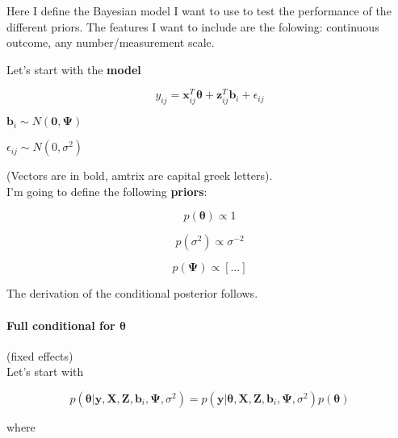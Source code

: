 \documentclass[a4paper]{article}
\begin{document}
Here I define the Bayesian model I want to use to test the performance of the different priors. The features I want to include are the folowing: continuous outcome, any number/measurement scale.

Let's start with the \textbf{model}

\begin{equation}
	y_{ij} = \bm{x}^{T}_{ij} \bm{\theta} + \bm{z}^{T}_{ij}\bm{b}_i + \epsilon_{ij}
\end{equation}

$ \bm{b}_i \sim N(\bm{0}, \bm{\Psi}) $

$ \epsilon_{ij} \sim N(0, \sigma^2) $

\vspace{5mm}

(Vectors are in bold, amtrix are capital greek letters).\\
I'm going to define the following \textbf{priors}:

\vspace{5mm}



\begin{equation}
p(\bm{\theta}) \propto 1
\end{equation}

\begin{equation}
p(\sigma^2) \propto \sigma^{-2}
\end{equation}

\begin{equation}
p(\bm{\Psi}) \propto [...]
\end{equation}

\vspace{5mm}

The derivation of the conditional posterior follows.

\paragraph{Full conditional for $\bm{\theta}$}(fixed effects) \\

Let's start with

\begin{equation}
	p(\bm{\theta}|\bm{y}, \bm{X}, \bm{Z}, \bm{b}_{i}, \bm{\Psi}, \sigma^2) = 	p(\bm{y}|\bm{\theta}, \bm{X}, \bm{Z}, \bm{b}_{i}, \bm{\Psi}, \sigma^2) p(\bm{\theta})
\end{equation}

where\\
\end{document}
